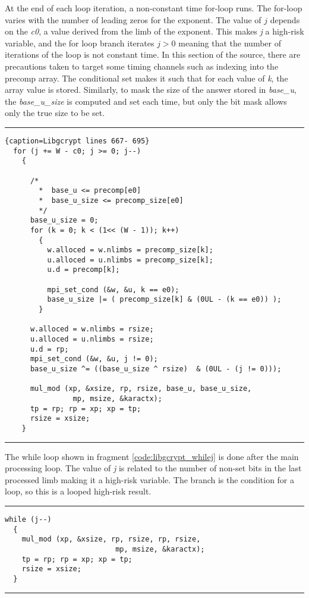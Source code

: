 \documentclass[11pt,a4paper]{article}
\newcommand{\codevar}[1]{\textit{#1}}
\begin{document}
At the end of each loop iteration, a non-constant time for-loop runs. The
for-loop varies with the number of leading zeros for the exponent. The value of
$j$ depends on the \codevar{c0}, a value derived from the limb of the exponent. This
makes \codevar{j} a high-risk variable, and the for loop branch iterates $j > 0$ meaning
that the number of iterations of the loop is not constant time. In this section
of the source, there are precautions taken to target some timing channels such
as indexing into the precomp array. The conditional set makes it such that for
each value of \codevar{k}, the array value is stored. Similarly, to mask the size of the
answer stored in \codevar{base\_u}, the \codevar{base\_u\_size} is computed and set each time, but only
the bit mask allows only the true size to be set.

\vspace{5pt}
\hrule
\begin{lstlisting}{caption=Libgcrypt lines 667- 695}
  for (j += W - c0; j >= 0; j--)
    {

      /*
        *  base_u <= precomp[e0]
        *  base_u_size <= precomp_size[e0]
        */
      base_u_size = 0;
      for (k = 0; k < (1<< (W - 1)); k++)
        {
          w.alloced = w.nlimbs = precomp_size[k];
          u.alloced = u.nlimbs = precomp_size[k];
          u.d = precomp[k];

          mpi_set_cond (&w, &u, k == e0);
          base_u_size |= ( precomp_size[k] & (0UL - (k == e0)) );
        }

      w.alloced = w.nlimbs = rsize;
      u.alloced = u.nlimbs = rsize;
      u.d = rp;
      mpi_set_cond (&w, &u, j != 0);
      base_u_size ^= ((base_u_size ^ rsize)  & (0UL - (j != 0)));

      mul_mod (xp, &xsize, rp, rsize, base_u, base_u_size,
                mp, msize, &karactx);
      tp = rp; rp = xp; xp = tp;
      rsize = xsize;
    }
\end{lstlisting}
\hrule
\vspace{5pt}

The while loop shown in fragment \ref{code:libgcrypt_whilej} is done after the main processing loop. The value of \codevar{j} is
related to the number of non-set bits in the last processed limb making it a
high-risk variable. The branch is the condition for a loop, so this is a looped
high-risk result. 
\vspace{5pt}
\hrule
\begin{lstlisting}[caption=Libgcrypt lines 702-707, label=code:libgcrypt_whilej]
while (j--)
  {
    mul_mod (xp, &xsize, rp, rsize, rp, rsize,
                          mp, msize, &karactx);
    tp = rp; rp = xp; xp = tp;
    rsize = xsize;
  }
\end{lstlisting}
\hrule
\vspace{5pt}
\end{document}
